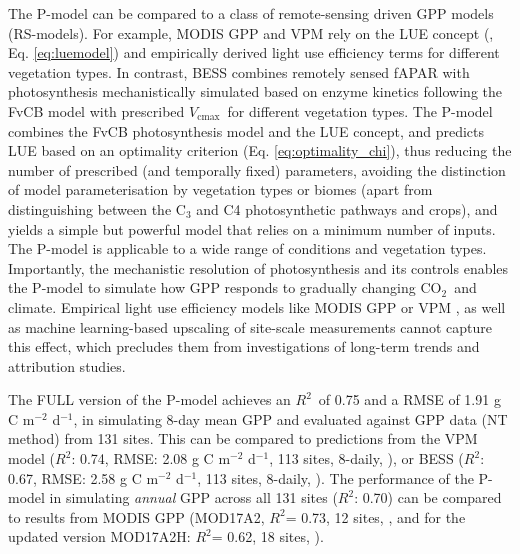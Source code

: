 \documentclass{myreport}
\newcommand{\coo}{CO$_2$}
\newcommand{\vcmax}{$V_{\text{cmax}}$}
\newcommand{\rsq}{$R^2$}
\begin{document}
The P-model can be compared to a class of remote-sensing driven GPP models (RS-models). For example, MODIS GPP \citep{running04} and VPM \citep{Zhang2017-yr} rely on the LUE concept (\cite{monteith72}, Eq. \ref{eq:luemodel}) and empirically derived light use efficiency terms for different vegetation types. In contrast, BESS \citep{jiang16rse} combines remotely sensed fAPAR with photosynthesis mechanistically simulated based on enzyme kinetics following the FvCB model with prescribed \vcmax\ for different vegetation types. The P-model combines the FvCB photosynthesis model and the LUE concept, and predicts LUE based on an optimality criterion (Eq. \ref{eq:optimality_chi}), thus reducing the number of prescribed (and temporally fixed) parameters, avoiding the distinction of model parameterisation by vegetation types or biomes (apart from distinguishing between the C$_3$ and C4 photosynthetic pathways and crops), and yields a simple but powerful model that relies on a minimum number of inputs. The P-model is applicable to a wide range of conditions and vegetation types. Importantly, the mechanistic resolution of photosynthesis and its controls enables the P-model to simulate how GPP responds to gradually changing \coo\ and climate. Empirical light use efficiency models like MODIS GPP \citep{running04} or VPM \citep{Zhang2017-yr}, as well as machine learning-based upscaling of site-scale measurements \citep{jung11jgr, tramontana16bg} cannot capture this effect, which precludes them from investigations of long-term trends and attribution studies.

The FULL version of the P-model achieves an \rsq\ of 0.75 and a RMSE of 1.91 g C m$^{-2}$ d$^{-1}$, in simulating 8-day mean GPP and evaluated against GPP data (NT method) from 131 sites. This can be compared to predictions from the VPM model (\rsq : 0.74, RMSE: 2.08 g C m$^{-2}$ d$^{-1}$, 113 sites, 8-daily, \cite{Zhang2017-yr}), or BESS (\rsq : 0.67, RMSE: 2.58 g C m$^{-2}$ d$^{-1}$, 113 sites, 8-daily, \cite{jiang16rse}). The performance of the P-model in simulating \textit{annual} GPP across all 131 sites (\rsq : 0.70) can be compared to results from MODIS GPP (MOD17A2, \rsq = 0.73, 12 sites, \cite{heinsch06}, and for the updated version MOD17A2H: \rsq = 0.62, 18 sites, \cite{wang17rs}). 
\end{document}
